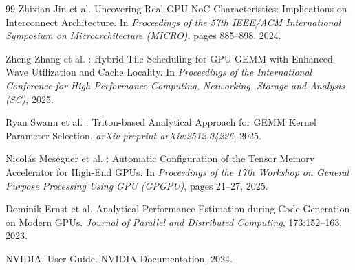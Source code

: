 \documentclass[10pt,twocolumn]{article}
\begin{document}
\begin{thebibliography}{99}
Zhixian Jin et al.
\newblock Uncovering Real {GPU} {NoC} Characteristics: Implications on
  Interconnect Architecture.
\newblock In \emph{Proceedings of the 57th IEEE/ACM International
  Symposium on Microarchitecture (MICRO)}, pages 885--898, 2024.

Zheng Zhang et al.
: Hybrid Tile Scheduling for {GPU} {GEMM} with
  Enhanced Wave Utilization and Cache Locality.
\newblock In \emph{Proceedings of the International Conference for
  High Performance Computing, Networking, Storage and Analysis (SC)},
  2025.

Ryan Swann et al.
: Triton-based Analytical Approach for {GEMM}
  Kernel Parameter Selection.
\newblock \emph{arXiv preprint arXiv:2512.04226}, 2025.

Nicol{\'a}s Meseguer et al.
: Automatic Configuration of the Tensor Memory
  Accelerator for High-End {GPUs}.
\newblock In \emph{Proceedings of the 17th Workshop on General Purpose
  Processing Using GPU (GPGPU)}, pages 21--27, 2025.

Dominik Ernst et al.
\newblock Analytical Performance Estimation during Code Generation on
  Modern {GPUs}.
\newblock \emph{Journal of Parallel and Distributed Computing},
  173:152--163, 2023.

{NVIDIA}.
 User Guide.
\newblock NVIDIA Documentation, 2024.

\end{thebibliography}
\end{document}
